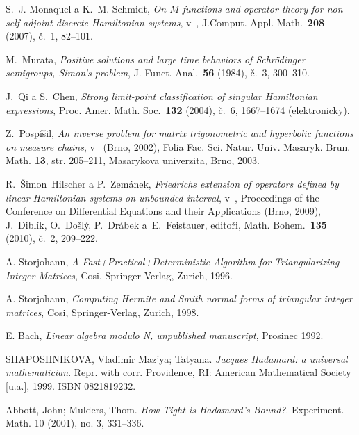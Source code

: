 \begin{thebibliography}{10}

S.~J. Monaquel a K.~M. Schmidt, \textit{On $M$-functions and operator
  theory for non-self-adjoint discrete Hamiltonian systems}, v~, J.Comput. Appl.
  Math.~\textbf{208} (2007), \v{c}.~1, 82--101.

M.~Murata, \textit{Positive solutions and large time behaviors of
  Schrödinger semigroups, Simon's problem}, J. Funct. Anal.~\textbf{56}
  (1984), č.~3, 300--310.

J.~Qi a S.~Chen, \textit{Strong limit-point classification of singular
  Hamiltonian expressions}, Proc. Amer. Math. Soc.~\textbf{132} (2004),
  č.~6, 1667--1674 (elektronicky).

Z.~Pospíšil, \textit{An inverse problem for matrix trigonometric and
  hyperbolic functions on measure chains}, v~ (Brno, 2002), Folia Fac.
  Sci. Natur. Univ. Masaryk. Brun. Math. {\bf 13}, str. 205--211, Masarykova
  univerzita, Brno, 2003.

R.~Šimon~Hilscher a P.~Zemánek, \textit{Friedrichs extension of
  operators defined by linear Hamiltonian systems on unbounded interval},
  v~, Proceedings of the Conference on Differential Equations and
  their Applications (Brno, 2009), J.~Diblík, O.~Došlý, P.~Drábek
  a~E.~Feistauer, editoři, Math. Bohem.~\textbf{135} (2010),
  č.~2, 209--222.

A. Storjohann, \textit{A Fast+Practical+Deterministic Algorithm for Triangularizing Integer Matrices},
Cosi, Springer-Verlag, Zurich, 1996.

A. Storjohann, \textit{Computing Hermite and Smith normal forms
of triangular integer matrices},
Cosi, Springer-Verlag, Zurich, 1998.

E. Bach, \textit{Linear algebra modulo N, unpublished manuscript},
Prosinec 1992.

SHAPOSHNIKOVA, Vladimir Maz'ya; Tatyana. \textit{Jacques Hadamard: a universal mathematician}.
Repr. with corr. Providence, RI: American Mathematical Society [u.a.], 1999. ISBN 0821819232.

Abbott, John; Mulders, Thom. \textit{How Tight is Hadamard's Bound?}.
Experiment. Math. 10 (2001), no. 3, 331--336.

\end{thebibliography}

\cleardoublepage
